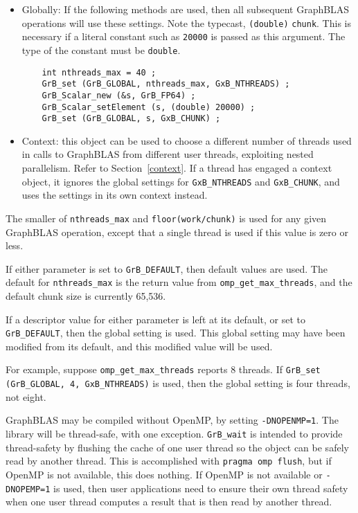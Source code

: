 \begin{itemize}

\item Globally:  If the following methods are used, then all subsequent
GraphBLAS operations will use these settings.  Note the typecast,
\verb'(double)' \verb'chunk'.  This is necessary if a literal constant such as
\verb'20000' is passed as this argument.  The type of the constant must be
\verb'double'.

    {\footnotesize
    \begin{verbatim}
    int nthreads_max = 40 ;
    GrB_set (GrB_GLOBAL, nthreads_max, GxB_NTHREADS) ;
    GrB_Scalar_new (&s, GrB_FP64) ;
    GrB_Scalar_setElement (s, (double) 20000) ;
    GrB_set (GrB_GLOBAL, s, GxB_CHUNK) ; \end{verbatim} }

\item Context: this object can be used to choose a different number of
threads used in calls to GraphBLAS from different user threads, exploiting
nested parallelism.  Refer to Section~\ref{context}.  If a thread has engaged a
context object, it ignores the global settings for \verb'GxB_NTHREADS' and
\verb'GxB_CHUNK', and uses the settings in its own context instead.

\end{itemize}

The smaller of \verb'nthreads_max' and \verb'floor(work/chunk)' is used for any
given GraphBLAS operation, except that a single thread is used if this value is
zero or less.

If either parameter is set to \verb'GrB_DEFAULT', then default values are used.
The default for \verb'nthreads_max' is the return value from
\verb'omp_get_max_threads', and the default chunk size is currently 65,536.

If a descriptor value for either parameter is left at its default, or set to
\verb'GrB_DEFAULT', then the global setting is used.  This global setting may
have been modified from its default, and this modified value will be used.

For example, suppose \verb'omp_get_max_threads' reports 8 threads.  If \newline
\verb'GrB_set (GrB_GLOBAL, 4, GxB_NTHREADS)' is used, then the global setting is four
threads, not eight.

GraphBLAS may be compiled without OpenMP, by setting \verb'-DNOPENMP=1'.
The library will be thread-safe, with one exception.  \verb'GrB_wait' is
intended to provide thread-safety by flushing the cache of one user thread
so the object can be safely read by another thread.  This is accomplished
with \verb'pragma omp flush', but if OpenMP is not available, this does
nothing.  If OpenMP is not available or \verb'-DNOPEMP=1' is used, then
user applications need to ensure their own thread safety when one user thread
computes a result that is then read by another thread.

